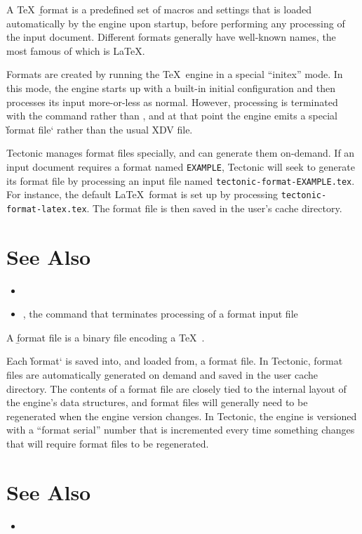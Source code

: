 
A \TeX\ \b{format} is a predefined set of macros and settings that is loaded
automatically by the engine upon startup, before performing any processing of
the input document. Different formats generally have well-known names, the most
famous of which is \LaTeX.

Formats are created by running the \TeX\ engine in a special “initex” mode. In
this mode, the engine starts up with a built-in initial configuration and then
processes its input more-or-less as normal. However, processing is terminated
with the  command rather than , and at that point the engine
emits a special \`format file` rather than the usual XDV file.

Tectonic manages format files specially, and can generate them on-demand. If an
input document requires a format named \texttt{EXAMPLE}, Tectonic will seek to
generate its format file by processing an input file named
\texttt{tectonic-format-EXAMPLE.tex}. For instance, the default \LaTeX\ format
is set up by processing \texttt{tectonic-format-latex.tex}. The format file is
then saved in the user's cache directory.

\section*{See Also}

\begin{itemize}
\item {}
\item {}, the command that terminates processing of a format input file
\end{itemize}

\tduxEmit



A \b{format file} is a binary file encoding a \TeX\ .

Each \`format` is saved into, and loaded from, a format file. In Tectonic,
format files are automatically generated on demand and saved in the user cache
directory. The contents of a format file are closely tied to the internal layout
of the engine's data structures, and format files will generally need to be
regenerated when the engine version changes. In Tectonic, the engine is
versioned with a “format serial” number that is incremented every time something
changes that will require format files to be regenerated.

\section*{See Also}

\begin{itemize}
\item {}
\end{itemize}
